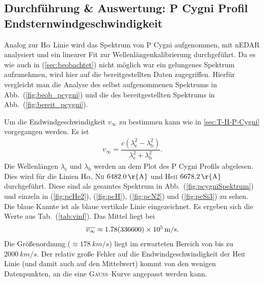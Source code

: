 \subsection{Durchführung \& Auswertung: P Cygni Profil\\Endsternwindgeschwindigkeit}
Analog zur H$\alpha $ Linie wird das Spektrum von P Cygni aufgenommen, mit nEDAR analysiert und ein linearer Fit zur Wellenlängenkalibrierung durchgeführt.
Da es wie auch in (\ref{sec:beobachtet}) nicht möglich war ein gelungenes Spektrum aufzunehmen, wird hier auf die bereitgestellten Daten zugegriffen.
Hierfür vergleicht man die Analyse des selbst aufgenommenen Spektrums in Abb.\ (\ref{fig:beob_pcygni}) und die des bereitgestellten Spektrums in Abb.\ (\ref{fig:bereit_pcygni}).

Um die Endwindgeschwindigkeit $v_\infty$ zu bestimmen kann wie in \ref{sec:T-H-P-Cygni} vorgegangen werden.
Es ist
\begin{align} 
  v_\infty=\dfrac{c\left(\lambda _\text{e}^2-\lambda _\text{b}^2\right)}{\lambda _\text{e}^2+\lambda _\text{b}^2}
.\end{align} 
Die Wellenlängen $\lambda _\text{e}$ und $\lambda _\text{b}$ werden an dem Plot des P Cygni Profils abgelesen.
Dies wird für die Linien H$\alpha$, N\textsc{ii} $\SI{6482,0}{\r{A}}$ und He\textsc{ii} $\SI{6678,2}{\r{A}}$ durchgeführt.  
Diese sind als gesamtes Spektrum in Abb.\ (\ref{fig:pcygniSpektrum}) und einzeln in (\ref{fig:pcHe2}), (\ref{fig:pcH}), (\ref{fig:pcN2}) und (\ref{fig:pcSi3}) zu sehen.
Die blaue Kannte ist als blaue vertikale Linie eingezeichnet.
Es ergeben sich die Werte aus Tab.\ (\ref{tab:vinf}).
Das Mittel liegt bei
\begin{align} 
  \overline{v_\infty}\approx \SI{1.78+-3366e+5}{m/s}
.\end{align} %
Die Größenordnung ($\approx \SI{178}{km/s}$) liegt im erwarteten Bereich von bis zu $\SI{2000}{km/s}$.
Der relativ große Fehler auf die Endwindgeschwindigkeit der He\textsc{ii} Linie (und damit auch auf den Mittelwert) kommt von den wenigen Datenpunkten, an die eine \textsc{Gauss}--Kurve angepasst werden kann. 
